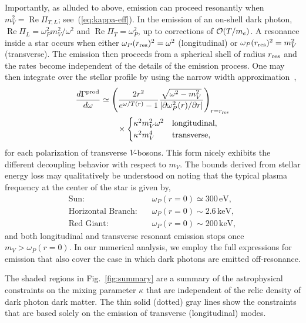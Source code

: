 \documentclass[prd,reprint,nofootinbib,notitlepage,aps,tightenlines,preprintnumbers,amsmath,amssymb,showpacs,superscriptaddress]{revtex4-1}
\newcommand{\eV}{\ensuremath{\mathrm{eV}}}
\newcommand{\keV}{\ensuremath{\mathrm{keV}}}
\DeclareMathOperator{\real}{Re}
\begin{document}
Importantly, as alluded to above, emission can proceed resonantly
when $m_V^2 =\real \Pi_{T,L}$; see~(\ref{eq:kappa-eff}).  In the
emission of an on-shell dark photon,
$\real \Pi_L = \omega_P^2 m_V^2/\omega^2 $ and
$\real \Pi_T = \omega_P^2$, up to corrections of
${\cal O}(T/m_e)$. A resonance inside a star occurs when either
$\omega_P(r_{\rm res})^2 = \omega^2 $ (longitudinal) or
$\omega_P(r_{\rm res})^2 = m_V^2 $ (transverse). The emission
then proceeds from a spherical shell of radius $r_{{\rm res}}$ and
the rates become independent of the details of the emission process. One
may then integrate over the stellar profile by using the narrow width
approximation~\cite{An:2013yfc,Redondo:2013lna},
%
\begin{align}
\label{eq:resonant-rates}
  \frac{d\Gamma^{\rm prod}}{d\omega } &\simeq  \left(
  \frac{2 r^2 }{e^{\omega/T(r)} - 1}
  \frac{\sqrt{\omega^2 - m_V^2}} {|\partial \omega_P^2(r)/\partial r|} 
\right)_{r=r_{\rm res}} \nonumber\\
&\qquad \times \begin{cases}
    \kappa^2 m_V^2 \omega^2 & \text{longitudinal}, \\
    \kappa^2 m_V^4          & \text{transverse} , \\
  \end{cases} 
\end{align}
%
for each polarization of transverse $V$-bosons. 
This form nicely exhibits the different decoupling behavior with
respect to $m_V$. 
The bounds derived from stellar energy loss may qualitatively
be understood on noting that the typical plasma frequency at the center
of the star is given by,
%
\begin{align*}
 \text{Sun:} &\quad \omega_P(r=0)  \simeq 300\,\eV    ,\\
 \text{Horizontal Branch:}  & \quad\omega_P(r=0) \sim 2.6 \,\keV    ,\\
 \text{Red Giant:}  &\quad \omega_P(r=0) \sim 200\,\keV   ,
\end{align*}
%
and both longitudinal and transverse resonant emission stops
once $m_V> \omega_P(r=0)$.
%
In our numerical analysis, we employ the full expressions for
emission that also cover the case in which dark photons are emitted
off-resonance.
%

%
%
%
%
%
%
%
%
%
%
%
%
%
%
%
%
%
%
%
%
%
%
%
%
%
%
%
%
%
%
%
%
%
%
%
%
%
%
%
%
%
%
%
%
%
%
%
%

The shaded regions in Fig.~\ref{fig:summary} are a summary of
the astrophysical constraints on the mixing parameter $\kappa $ that are
independent of the relic density of dark photon dark matter. The thin solid
(dotted) gray lines show the constraints that are based solely on the
emission of transverse (longitudinal) modes.
\end{document}
